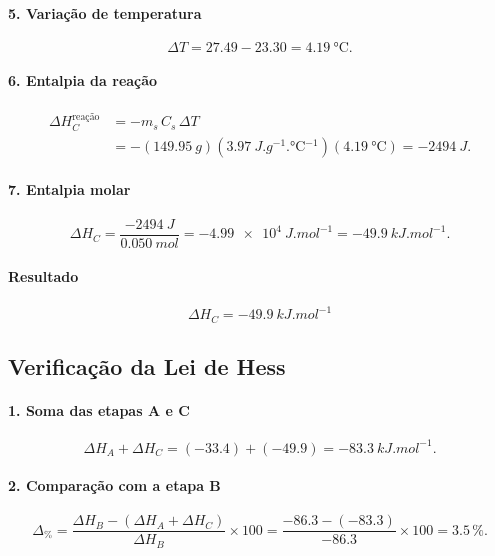 \paragraph{5. Variação de temperatura}
\[
\Delta T=\num{27,49}-\num{23,30}=\SI{4,19}{\degreeCelsius}.
\]

\paragraph{6. Entalpia da reação}
\[
\begin{aligned}
\Delta H_C^{\text{reação}}&=-m_s\,C_s\,\Delta T
\\
&=-\left(\SI{149,95}{g}\right)\left(\SI{3,97}{J.g^{-1}.\degreeCelsius^{-1}}\right)\left(\SI{4,19}{\degreeCelsius}\right)
=\SI{-2494}{J}.
\end{aligned}
\]

\paragraph{7. Entalpia molar}
\[
\Delta H_C=\frac{\SI{-2494}{J}}{\SI{0,050}{mol}}
=\SI{-4,99e4}{J.mol^{-1}}
=\SI{-49,9}{kJ.mol^{-1}}.
\]

\paragraph{Resultado}
\[
\boxed{\Delta H_C=\SI{-49,9}{kJ.mol^{-1}}}
\]

\subsection{Verificação da Lei de Hess}

\paragraph{1. Soma das etapas A e C}
\[
\Delta H_A+\Delta H_C=(\num{-33,4})+(\num{-49,9})=\SI{-83,3}{kJ.mol^{-1}}.
\]

\paragraph{2. Comparação com a etapa B}
\[
\Delta_{\%}=\frac{\Delta H_B-(\Delta H_A+\Delta H_C)}{\Delta H_B}\times100
=\frac{\num{-86,3}-\left(\num{-83,3}\right)}{\num{-86,3}}\times100
=\num{3,5}\,\%.
\]

